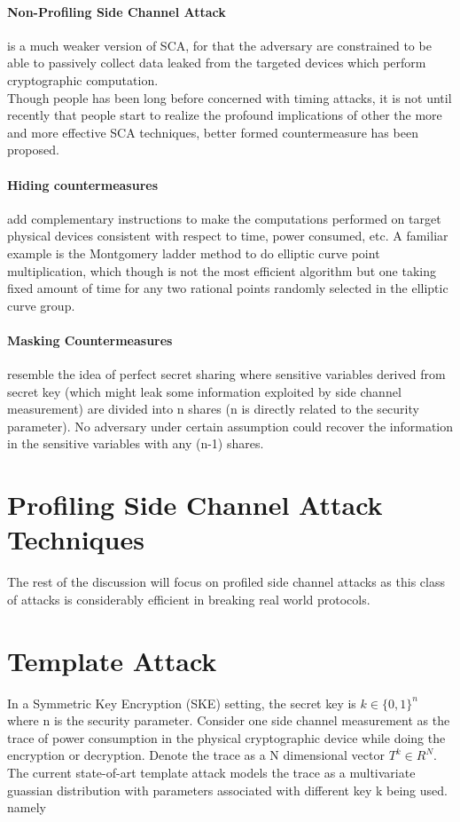 \documentclass[18]{article}
\begin{document}
\paragraph{Non-Profiling Side Channel Attack} is a much weaker version of SCA, for that the adversary are constrained to be able to passively collect data leaked from the targeted devices which perform cryptographic computation.\\

Though people has been long before concerned with timing attacks, it is not until recently that people start to realize the profound implications of other the more and more effective SCA techniques, better formed countermeasure has been proposed.
\paragraph{Hiding countermeasures} add complementary instructions to make the computations performed on target physical devices consistent with respect to time, power consumed, etc. A familiar example is the Montgomery ladder method to do elliptic curve point multiplication, which though is not the most efficient algorithm but one taking fixed amount of time for any two rational points randomly selected in the elliptic curve group.
\paragraph{Masking Countermeasures} resemble the idea of perfect secret sharing where sensitive variables derived from secret key (which might leak some information exploited by side channel measurement) are divided into n shares (n is directly related to the security parameter). No adversary under certain assumption could recover the information in the sensitive variables with any (n-1) shares.

\section{Profiling Side Channel Attack Techniques}
The rest of the discussion will focus on profiled side channel attacks as this class of attacks is considerably efficient in breaking real world protocols.

\section{Template Attack}
In a Symmetric Key Encryption (SKE) setting, the secret key is $k\in \{0,1\}^n$ where n is the security parameter.
Consider one side channel measurement as the trace of power consumption in the physical cryptographic device while doing the encryption or decryption. Denote the trace as a N dimensional vector $T^k \in R^N$.
The current state-of-art template attack models the trace as a multivariate guassian distribution with parameters associated with different key k being used. namely
\end{document}
